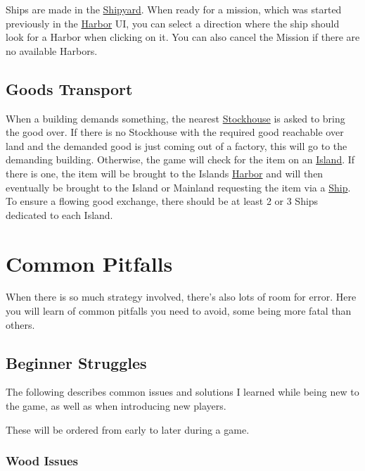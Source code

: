 \documentclass[12pt]{article}
\begin{document}
Ships are made in the \hyperref[sec:shipyard]{Shipyard}. When ready for a mission, which was started previously in the \hyperref[sec:harbor]{Harbor} UI, you can select a direction where the ship should look for a Harbor when clicking on it. You can also cancel the Mission if there are no available Harbors.

\subsection{Goods Transport}
\label{sec:goodstransport}

When a building demands something, the nearest \hyperref[sec:stockhouse]{Stockhouse} is asked to bring the good over. If there is no Stockhouse with the required good reachable over land and the demanded good is just coming out of a factory, this will go to the demanding building. Otherwise, the game will check for the item on an \hyperref[sec:islands]{Island}. If there is one, the item will be brought to the Islands \hyperref[sec:harbor]{Harbor} and will then eventually be brought to the Island or Mainland requesting the item via a \hyperref[sec:ships]{Ship}. To ensure a flowing good exchange, there should be at least 2 or 3 Ships dedicated to each Island.

\section{Common Pitfalls}
\label{sec:commonpitfalls}

When there is so much strategy involved, there's also lots of room for error. Here you will learn of common pitfalls you need to avoid, some being more fatal than others.

\subsection{Beginner Struggles}
\label{sec:beginnerstruggles}

The following describes common issues and solutions I learned while being new to the game, as well as when introducing new players.

These will be ordered from early to later during a game.

\subsubsection{Wood Issues}
\label{sec:woodissues}
\end{document}
